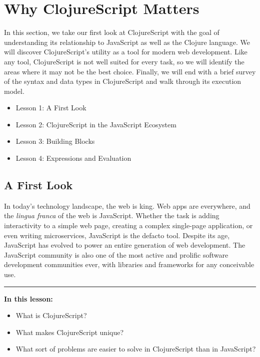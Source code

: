 \documentclass[10pt,twoside,openright]{memoir}
\begin{document}
\cleardoublepage

\tableofcontents

\cleardoublepage

\mainmatter
\sloppy

{\let\newpage\relax\part{Why ClojureScript Matters}}

In this section, we take our first look at ClojureScript with the goal
of understanding its relationship to JavaScript as well as the Clojure
language. We will discover ClojureScript's utility as a tool for modern
web development. Like any tool, ClojureScript is not well suited for
every task, so we will identify the areas where it may not be the best
choice. Finally, we will end with a brief survey of the syntax and data
types in ClojureScript and walk through its execution model.

\begin{itemize}
\tightlist
\item Lesson 1: A First Look
\item Lesson 2: ClojureScript in the JavaScript Ecosystem
\item Lesson 3: Building Blocks
\item Lesson 4: Expressions and Evaluation
\end{itemize}

\chapter{A First Look}

In today's technology landscape, the web is king. Web apps are
everywhere, and the \emph{lingua franca} of the web is JavaScript.
Whether the task is adding interactivity to a simple web page, creating
a complex single-page application, or even writing microservices,
JavaScript is the defacto tool. Despite its age, JavaScript has evolved
to power an entire generation of web development. The JavaScript
community is also one of the most active and prolific software
development communities ever, with libraries and frameworks for any
conceivable use.

\begin{center}\rule{0.5\linewidth}{0.5pt}\end{center}

\textbf{In this lesson:}

\begin{itemize}
\tightlist
\item
  What is ClojureScript?
\item
  What makes ClojureScript unique?
\item
  What sort of problems are easier to solve in ClojureScript than in
  JavaScript?
\end{itemize}
\end{document}
